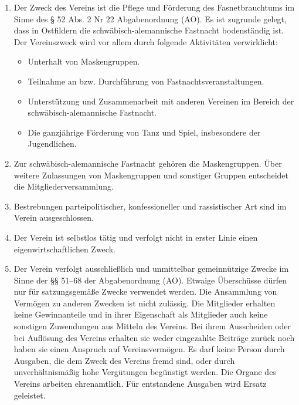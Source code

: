 \begin{enumerate}
    \item \label{sa:abs:kqifp7} Der Zweck des Vereins ist die Pflege und Förderung des Fasnetbrauchtums im Sinne des § 52 Abs. 2 Nr 22 Abgabenordnung (AO). Es ist zugrunde gelegt, dass in Ostfildern die schwäbisch-alemannische Fastnacht bodenständig ist.
    \\
    Der Vereinszweck wird vor allem durch folgende Aktivitäten verwirklicht:
    \begin{itemize}
        \item Unterhalt von Maskengruppen.
        \item Teilnahme an bzw. Durchführung von Fastnachtsveranstaltungen.
        \item Unterstützung und Zusammenarbeit mit anderen Vereinen im Bereich der schwäbisch-alemannische Fastnacht.
        \item Die ganzjährige Förderung von Tanz und Spiel, insbesondere der Jugendlichen.
    \end{itemize}
    
    \item \label{sa:abs:iu3z0s} Zur schwäbisch-alemannische Fastnacht gehören die Maskengruppen. Über weitere Zulassungen von Maskengruppen und sonstiger Gruppen entscheidet die Mitgliederversammlung.

    \item \label{sa:abs:kasx7q} Bestrebungen parteipolitischer, konfessioneller und rassistischer Art sind im Verein ausgeschlossen.

    \item \label{sa:abs:zlzq1g} Der Verein ist selbstlos tätig und verfolgt nicht in erster Linie einen eigenwirtschaftlichen Zweck.
        
    \item \label{sa:abs:g3z0xf} Der Verein verfolgt ausschließlich und unmittelbar gemeinnützige Zwecke im Sinne der §§ 51–68 der Abgabenordnung (AO). Etwaige Überschüsse dürfen nur für satzungsgemäße Zwecke verwendet werden. Die Ansammlung von Vermögen zu anderen Zwecken ist nicht zulässig. Die Mitglieder erhalten keine Gewinnanteile und in ihrer Eigenschaft als Mitglieder auch keine sonstigen Zuwendungen aus Mitteln des Vereins. Bei ihrem Ausscheiden oder bei Auflösung des Vereins erhalten sie weder eingezahlte Beiträge zurück noch haben sie einen Anspruch auf Vereinsvermögen. Es darf keine Person durch Ausgaben, die dem Zweck des Vereins fremd sind, oder durch unverhältnismäßig hohe Vergütungen begünstigt werden. Die Organe des Vereins arbeiten ehrenamtlich. Für entstandene Ausgaben wird Ersatz geleistet.
\end{enumerate}

